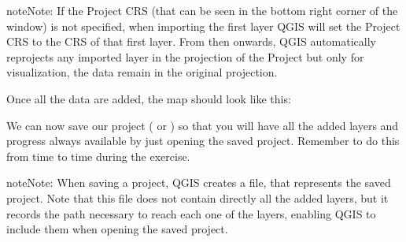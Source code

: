 \documentclass[letterpaper,10pt,english]{sphinxmanual}
\begin{document}
\begin{sphinxadmonition}{note}{Note:}
If the Project CRS (that can be seen in the bottom right corner of the window) is not specified, when importing the first layer QGIS
will set the Project CRS to the CRS of that first layer. From then onwards, QGIS automatically reprojects any imported layer in the
projection of the Project but only for visualization, the data remain in the original projection.
\end{sphinxadmonition}

Once all the data are added, the map should look like this:

\noindent{}

We can now save our project ( or ) so that you will have all the added layers and progress always available by just
opening the saved project. Remember to do this from time to time during the exercise.

\begin{sphinxadmonition}{note}{Note:}
When saving a project, QGIS creates a  file, that represents the saved project. Note that this file does not contain directly all
the added layers, but it records the path necessary to reach each one of the layers, enabling QGIS to include them when opening the saved project.
\end{sphinxadmonition}
\end{document}
